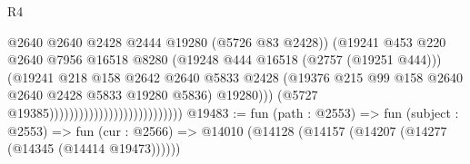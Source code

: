\begin{lexlean}{R4}
\begin{coremodule}
                                                            @2640
                                                            @2640
                                                            @2428
                                                            @2444
                                                            @19280
                                                            (@5726 @83 @2428))
                                                          (@19241
                                                            @453
                                                            @220
                                                            @2640
                                                            @7956
                                                            @16518
                                                            @8280
                                                            (@19248
                                                              @444
                                                              @16518
                                                              (@2757 (@19251 @444)))
                                                            (@19241
                                                              @218
                                                              @158
                                                              @2642
                                                              @2640
                                                              @5833
                                                              @2428
                                                              (@19376
                                                                @215
                                                                @99
                                                                @158
                                                                @2640
                                                                @2640
                                                                @2428
                                                                @5833
                                                                @19280
                                                                @5836)
                                                              @19280)))
                                                        (@5727 @19385)))))))))))))))))))))))))))
@19483 := fun (path : @2553) =>
  fun (subject : @2553) =>
  fun (cur : @2566) => @14010 (@14128 (@14157 (@14207 (@14277 (@14345 (@14414 @19473))))))

\end{coremodule}
\end{lexlean}
